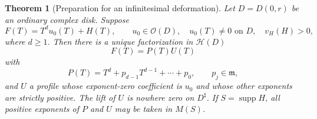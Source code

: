 \documentclass[11pt,a4paper]{article}
\numberwithin{equation}{section}
\newtheorem{theorem}{Theorem}[section]
\theoremstyle{definition}
\newcommand{\OO}{\mathcal O}
\newcommand{\mm}{\mathfrak m}
\newcommand{\HH}{\mathscr H}
\newcommand{\supp}{\operatorname{supp}}
\newcommand{\vprof}{v_{\!H}}
\begin{document}
\begin{theorem}[Preparation for an infinitesimal deformation]\label{thm:weierstrass}
Let $D=D(0,r)$ be an ordinary complex disk. Suppose
\begin{equation}\label{eq:prepinput}
 F(T)=T^d u_0(T)+H(T),\qquad
 u_0\in\OO(D),\quad u_0(T)\neq0\text{ on }D,\quad
 \vprof(H)>0,
\end{equation}
where $d\geq1$. Then there is a unique factorization in $\HH(D)$
\begin{equation}\label{eq:prep}
 F(T)=P(T)U(T)
\end{equation}
with
\[
 P(T)=T^d+p_{d-1}T^{d-1}+\cdots+p_0,\qquad p_j\in\mm,
\]
and $U$ a profile whose exponent-zero coefficient is $u_0$ and whose other
exponents are strictly positive. The lift of $U$ is nowhere zero on $D^\sharp$.
If $S=\supp H$, all positive exponents of $P$ and $U$ may be taken in $M(S)$.
\end{theorem}
\end{document}
